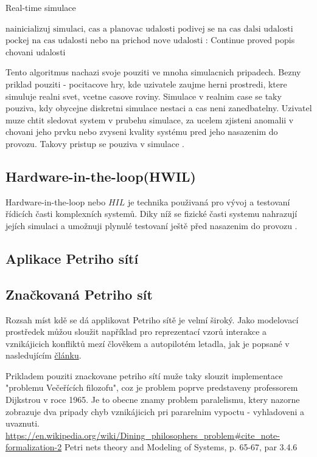 \begin{algorithm}
\caption{Real-time simulace}\label{euclid}
\begin{algorithmic}[1]
\State $\text{nainicializuj simulaci, cas a planovac udalosti}$
\State $\text{podivej se na cas dalsi udalosti}$
\Return
\EndIf
\State $\text{pockej na cas udalosti nebo na prichod nove udalosti}$
:
    \State Continue
\EndIf
\State proved popis chovani udalosti
\EndWhile
\end{algorithmic}
\end{algorithm}

Tento algoritmus nachazi svoje pouziti ve mnoha simulacnich pripadech. Bezny priklad pouziti - pocitacove hry, kde uzivatele zaujme herni prostredi, ktere simuluje realni svet, vcetne casove roviny. Simulace v realnim case se taky pouziva, kdy obycejne diskretni simulace nestaci a cas neni zanedbatelny. Uzivatel muze chtit sledovat system v prubehu simulace, za ucelem zjisteni anomalii v chovani jeho prvku nebo zvyseni kvality systému pred jeho nasazenim do provozu. Takovy pristup se pouziva v simulace \hyperref[sec:hwil]{}.
\subsection{Hardware-in-the-loop(HWIL)}
\label{sec:hwil}
Hardware-in-the-loop nebo $HIL$ je technika použivaná pro vývoj a testovaní řídicích časti komplexních systemů. Diky níž se fizické časti systemu nahrazují jejích simulaci a umožnuji plynulé testovaní ještě před nasazenim do provozu \cite{hil}.

\subsection{Aplikace Petriho sítí}

\subsection{Značkovaná Petriho sít}
Rozsah míst kdě se dá applikovat Petriho sítě je velmí široký. Jako modelovací prostředek můžou sloužit například pro reprezentací vzorů interakce a vznikájicich konfliktů mezí člověkem a autopilotém letadla, jak je popsané v nasledujícím \href{https://www-tandfonline-com.ezproxy.lib.vutbr.cz/doi/full/10.1080/00140139.2013.877597}{článku}.

Prikladem pouziti znackovane petriho sítí muže taky slouzit implementace "problemu Večeřících filozofu", coz je problem poprve predstaveny professorem Dijkstrou v roce 1965.
Je to obecne znamy problem paralelismu, ktery nazorne zobrazuje dva pripady chyb vznikájicich pri pararelnim vypoctu - vyhladoveni a uvaznuti.
\url{https://en.wikipedia.org/wiki/Dining_philosophers_problem#cite_note-formalization-2} Petri nets theory and Modeling of Systems, p. 65-67, par 3.4.6
